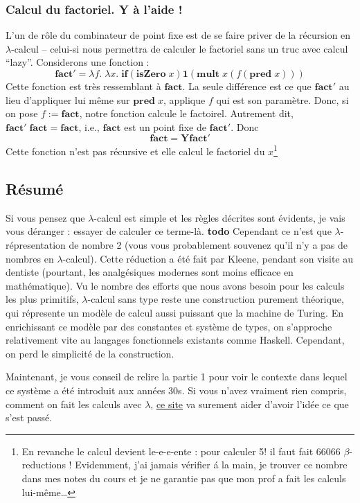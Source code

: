 \documentclass[12pt, a4paper]{article}
\newcommand{\lx}{\lambda x}
\newcommand{\lf}{\lambda f}
\begin{document}
\subsubsection*{Calcul du factoriel. Y à l'aide !}
L'un de rôle du combinateur de point fixe est de se faire priver de la récursion en $\lambda$-calcul -- celui-si nous permettra de calculer le factoriel sans un truc avec calcul ``lazy''.
Considerons une fonction :
$$\mathbf{fact'} = \lf. \; \lx. \; \mathbf{if} (\mathbf{isZero} \; x) \mathbf{1} (\mathbf{mult} \; x (f (\mathbf{pred} \; x)))$$
Cette fonction est très ressemblant à $\mathbf{fact}$. La seule différence est ce que $\mathbf{fact'}$ au lieu d'appliquer lui même sur $\mathbf{pred} \; x$, applique $f$ qui est son paramètre.
Donc, si on pose $f := \mathbf{fact}$, notre fonction calcule le factoirel.
Autrement dit, $\mathbf{fact'} \; \mathbf{fact} = \mathbf{fact}$, i.e., $\mathbf{fact}$ est un point fixe de $\mathbf{fact'}$.
Donc $$\mathbf{fact} = \mathbf{Y} \mathbf{fact'}$$
Cette fonction n'est pas récursive et elle calcul le factoriel du $x$\footnote{
	En revanche le calcul devient le-e-e-ente : pour calculer 5! il faut fait 66066 $\beta$-reductions ! Evidemment, j'ai jamais vérifier á la main, je trouver ce nombre dans mes notes du cours et je ne garantie pas que mon prof a fait les calculs lui-même\ldots
}

\subsection*{Résumé}
Si vous pensez que $\lambda$-calcul est simple et les règles décrites sont évidents, je vais vous déranger : essayer de calculer ce terme-là.
\textbf{todo}
Cependant ce n'est que $\lambda$-répresentation de nombre 2 (vous vous probablement souvenez qu'il n'y a pas de nombres en $\lambda$-calcul).
Cette réduction a été fait par Kleene, pendant son visite au dentiste (pourtant, les analgésiques modernes sont moins efficace en mathématique).
Vu le nombre des efforts que nous avons besoin pour les calculs les plus primitifs, $\lambda$-calcul sans type reste une construction purement théorique, qui répresente un modèle de calcul aussi puissant que la machine de Turing.
En enrichissant ce modèle par des constantes et système de types, on s'approche relativement vite au langages fonctionnels existants comme Haskell.
Cependant, on perd le simplicité de la construction.

Maintenant, je vous conseil de relire la partie 1 pour voir le contexte dans lequel ce système a été introduit aux années 30s.
Si vous n'avez vraiment rien compris, comment on fait les calculs avec $\lambda$, \href{http://worrydream.com/AlligatorEggs/}{ce site} va surement aider d'avoir l'idée ce que s'est passé.
\end{document}
